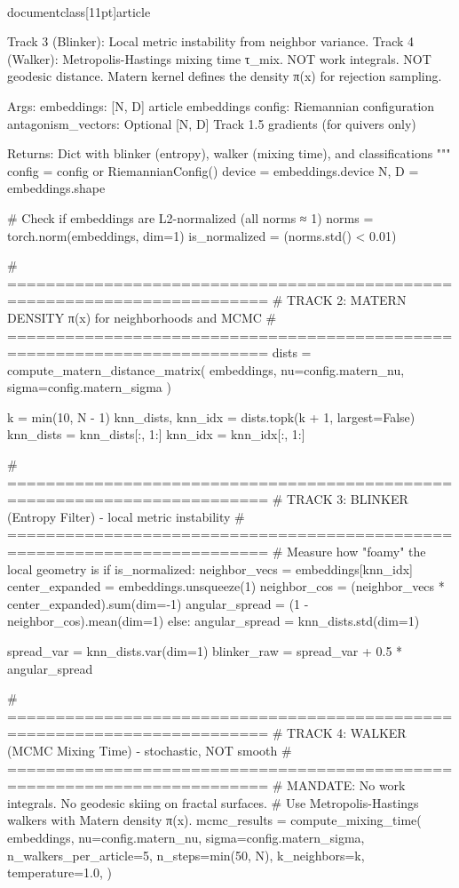 \\documentclass[11pt]{article}
\begin{document}
\begin{CodeBlock}
    Track 3 (Blinker): Local metric instability from neighbor variance.
    Track 4 (Walker):  Metropolis-Hastings mixing time τ_mix.
                       NOT work integrals. NOT geodesic distance.
                       Matern kernel defines the density π(x) for rejection sampling.

    Args:
        embeddings: [N, D] article embeddings
        config: Riemannian configuration
        antagonism_vectors: Optional [N, D] Track 1.5 gradients (for quivers only)

    Returns:
        Dict with blinker (entropy), walker (mixing time), and classifications
    """
    config = config or RiemannianConfig()
    device = embeddings.device
    N, D = embeddings.shape

    # Check if embeddings are L2-normalized (all norms ≈ 1)
    norms = torch.norm(embeddings, dim=1)
    is_normalized = (norms.std() < 0.01)

    # =========================================================================
    # TRACK 2: MATERN DENSITY π(x) for neighborhoods and MCMC
    # =========================================================================
    dists = compute_matern_distance_matrix(
        embeddings,
        nu=config.matern_nu,
        sigma=config.matern_sigma
    )

    k = min(10, N - 1)
    knn_dists, knn_idx = dists.topk(k + 1, largest=False)
    knn_dists = knn_dists[:, 1:]
    knn_idx = knn_idx[:, 1:]

    # =========================================================================
    # TRACK 3: BLINKER (Entropy Filter) - local metric instability
    # =========================================================================
    # Measure how "foamy" the local geometry is
    if is_normalized:
        neighbor_vecs = embeddings[knn_idx]
        center_expanded = embeddings.unsqueeze(1)
        neighbor_cos = (neighbor_vecs * center_expanded).sum(dim=-1)
        angular_spread = (1 - neighbor_cos).mean(dim=1)
    else:
        angular_spread = knn_dists.std(dim=1)

    spread_var = knn_dists.var(dim=1)
    blinker_raw = spread_var + 0.5 * angular_spread

    # =========================================================================
    # TRACK 4: WALKER (MCMC Mixing Time) - stochastic, NOT smooth
    # =========================================================================
    # MANDATE: No work integrals. No geodesic skiing on fractal surfaces.
    # Use Metropolis-Hastings walkers with Matern density π(x).
    mcmc_results = compute_mixing_time(
        embeddings,
        nu=config.matern_nu,
        sigma=config.matern_sigma,
        n_walkers_per_article=5,
        n_steps=min(50, N),
        k_neighbors=k,
        temperature=1.0,
    )


\end{CodeBlock}
\end{document}
